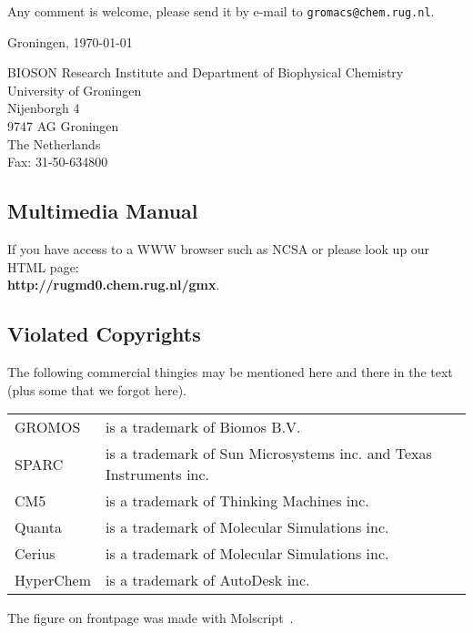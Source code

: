 \documentclass[11pt,dvips]{book}
\newcommand{\wwwpage}{http://rugmd0.chem.rug.nl/\raisebox{-0.8ex}{\~{ }}gmx}
\begin{document}
Any comment is welcome, please send it by e-mail to
{\tt gromacs@chem.rug.nl}. 
\medskip

Groningen, \today
\medskip

{\sf BIOSON} Research Institute and Department of Biophysical Chemistry	\\
University of Groningen \\ 
Nijenborgh 4				\\
9747 AG Groningen			\\
The Netherlands				\\
Fax: 31-50-634800

\newpage
\subsection*{Multimedia Manual}
If you  have access to a WWW browser such as NCSA 
or 
please look up
our HTML page: \\
{\bf \wwwpage}.

\subsection*{Violated Copyrights}
The following commercial thingies may be mentioned here and there in the
text (plus some that we forgot here).

\begin{tabularx}{\linewidth}{lX}
\hline
GROMOS    & is a trademark of Biomos B.V.\\
SPARC     & is a trademark of Sun Microsystems inc. and Texas Instruments inc.\\
CM5       & is a trademark of Thinking Machines inc.\\
Quanta    & is a trademark of Molecular Simulations inc.\\
Cerius    & is a trademark of Molecular Simulations inc.\\
HyperChem & is a trademark of AutoDesk inc.\\
\hline
\end{tabularx}

\vspace{0.5cm}

The figure on frontpage was made with Molscript~\cite{Kraulis91}.

%
%
\tableofcontents
\listoffigures
\listoftables

%
%
\
\cleardoublepage
\setcounter{page}{1}








%



%
%
\appendix






%
%
\cleardoublepage
{}



%
%
\cleardoublepage
{}
\printindex
\end{document}
